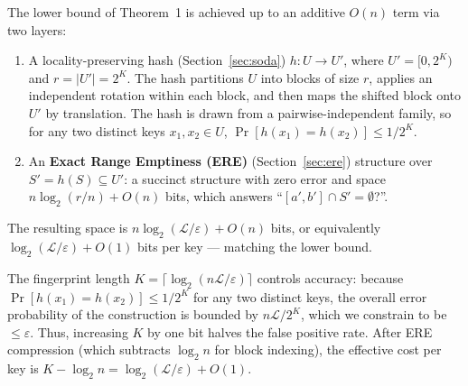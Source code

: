 %
%
%
%

\begin{theorem}
The lower bound of Theorem~1 is achieved up to an additive $O(n)$ term
via two layers:
\begin{enumerate}
    \item A locality-preserving hash (Section~\ref{sec:soda}) $h\colon U \to U'$, where $U' = [0, 2^K)$ and $r = |U'| = 2^K$.
    The hash partitions $U$ into blocks of size $r$, applies an independent rotation
    within each block, and then maps the shifted block onto $U'$ by translation.
    The hash is drawn from a pairwise-independent family, so for any two distinct
    keys $x_1, x_2 \in U$, $\Pr[h(x_1) = h(x_2)] \leq 1/2^K$.

    \item An \textbf{Exact Range Emptiness (ERE)} (Section~\ref{sec:ere}) structure over $S' = h(S) \subseteq U'$:
    a succinct structure with zero error and space $n \log_2(r/n) + O(n)$ bits, which answers ``$[a', b'] \cap S' = \emptyset$?''.
\end{enumerate}
\end{theorem}

The resulting space is $n \log_2(\mathcal{L}/\varepsilon) + O(n)$ bits, or equivalently
$\log_2(\mathcal{L}/\varepsilon) + O(1)$ bits per key --- matching the lower bound.

The fingerprint length $K = \lceil\log_2(n\mathcal{L}/\varepsilon)\rceil$ controls accuracy:
because $\Pr[h(x_1) = h(x_2)] \leq 1/2^K$ for any two distinct keys, the overall error
probability of the construction is bounded by $n\mathcal{L}/2^K$, which we constrain to be $\le \varepsilon$.
Thus, increasing $K$ by one bit halves the false positive rate. After ERE compression
(which subtracts $\log_2 n$ for block indexing), the effective cost per key is
$K - \log_2 n = \log_2(\mathcal{L}/\varepsilon) + O(1).$

